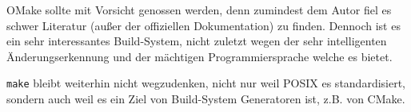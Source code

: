 OMake sollte mit Vorsicht genossen werden, denn zumindest dem Autor fiel es
schwer Literatur (außer der offiziellen Dokumentation) zu finden. Dennoch ist es
ein sehr interessantes Build-System, nicht zuletzt wegen der sehr intelligenten
Änderungserkennung und der mächtigen Programmiersprache welche es bietet.

\texttt{make} bleibt weiterhin nicht wegzudenken, nicht nur weil POSIX es
standardisiert, sondern auch weil es ein Ziel von Build-System Generatoren ist,
z.B. von CMake.
